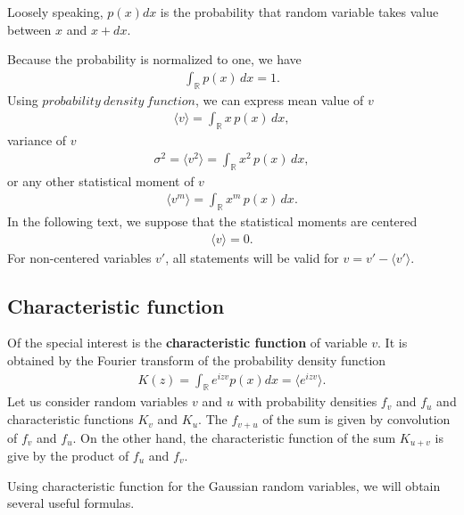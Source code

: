 Loosely speaking, $p(x)dx$ is the probability that random variable takes value between $x$ and $x+dx$.

Because the probability is normalized to one, we have
\begin{align}
\int_{\mathbb{R}} p(x) \, dx = 1.
\end{align}
Using $probability~density~function$, we can express mean value of $v$
\begin{align}
\langle v \rangle = \int_{\mathbb{R}} x \, p(x) \, dx ,
\end{align}
variance of $v$
\begin{align}
\sigma^2 = \langle v^2 \rangle = \int_{\mathbb{R}} x^2 \, p(x) \, dx ,
\end{align}
or any other statistical moment of $v$
\begin{align}
\langle v^m \rangle = \int_{\mathbb{R}} x^m \, p(x) \, dx.
\end{align}
In the following text, we suppose that the statistical moments are centered
\begin{align*}
\langle v \rangle = 0.
\end{align*}
For non-centered variables $v'$, all statements will be valid for $v = v' - \langle v' \rangle$.

\subsection{Characteristic function}

Of the special interest is the \textbf{characteristic function} of variable $v$. It is obtained by the Fourier transform of the probability density function
\begin{align*}
K(z) = \int_{\mathbb{R}} e^{izv} p(x) dx = \langle e^{izv} \rangle.
\end{align*}
Let us consider random variables $v$ and $u$ with probability densities $f_v$ and $f_u$ and characteristic functions $K_v$ and $K_u$. The $f_{v+u}$ of the sum is given by convolution of $f_v$ and $f_u$. On the other hand, the characteristic function of the sum $K_{u+v}$ is give by the product of $f_u$ and $f_v$.

\bigskip

Using characteristic function for the Gaussian random variables, we will obtain several useful formulas.

